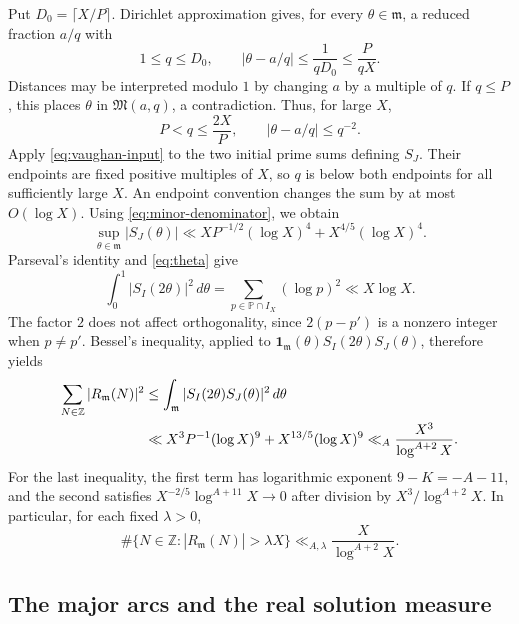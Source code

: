 \documentclass[11pt,letterpaper]{article}
\numberwithin{equation}{section}
\theoremstyle{remark}
\newcommand{\Z}{\mathbb Z}
\newcommand{\Pp}{\mathbb P}
\newcommand{\ind}{\mathbf 1}
\newcommand{\ceil}[1]{\lceil #1\rceil}
\begin{document}
Put $D_0=\ceil{X/P}$. Dirichlet approximation gives, for every
$\theta\in\mathfrak m$, a reduced fraction $a/q$ with
\[
 1\le q\le D_0,\qquad
 |\theta-a/q|\le\frac1{qD_0}\le\frac{P}{qX}.
\]
Distances may be interpreted modulo $1$ by changing $a$ by a
multiple of $q$. If $q\le P$, this places $\theta$ in
$\mathfrak M(a,q)$, a contradiction. Thus, for large $X$,
\begin{equation}\label{eq:minor-denominator}
 P<q\le\frac{2X}{P},\qquad |\theta-a/q|\le q^{-2}.
\end{equation}
Apply \eqref{eq:vaughan-input} to the two initial prime sums defining
$S_J$. Their endpoints are fixed positive multiples of $X$, so
$q$ is below both endpoints for all sufficiently large $X$.
An endpoint convention changes the sum by at most $O(\log X)$.
Using \eqref{eq:minor-denominator}, we obtain
\begin{equation}\label{eq:minor-sup}
 \sup_{\theta\in\mathfrak m}|S_J(\theta)|
 \ll XP^{-1/2}(\log X)^4+X^{4/5}(\log X)^4.
\end{equation}
Parseval's identity and \eqref{eq:theta} give
\[
 \int_0^1|S_I(2\theta)|^2\,d\theta
 =\sum_{p\in\Pp\cap I_X}(\log p)^2\ll X\log X.
\]
The factor $2$ does not affect orthogonality, since $2(p-p')$ is
a nonzero integer when $p\ne p'$. Bessel's inequality, applied to
$\ind_{\mathfrak m}(\theta)S_I(2\theta)S_J(\theta)$, therefore yields
\begin{align}
 \sum_{N\in\Z}|R_{\mathfrak m}(N)|^2
 &\le\int_{\mathfrak m}|S_I(2\theta)S_J(\theta)|^2\,d\theta\notag\\
 &\ll X^3P^{-1}(\log X)^9+X^{13/5}(\log X)^9
 \ll_A \frac{X^3}{\log^{A+2}X}.\label{eq:minor-L2}
\end{align}
For the last inequality, the first term has logarithmic exponent
$9-K=-A-11$, and the second satisfies
$X^{-2/5}\log^{A+11}X\to0$ after division by $X^3/\log^{A+2}X$.
In particular, for each fixed $\lambda>0$,
\begin{equation}\label{eq:minor-exceptions}
 \#\{N\in\Z:|R_{\mathfrak m}(N)|>\lambda X\}
 \ll_{A,\lambda}\frac{X}{\log^{A+2}X}.
\end{equation}

\subsection{The major arcs and the real solution measure}
\end{document}
